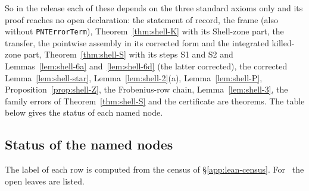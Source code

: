 So in the release each of these depends on the three standard axioms only and its proof reaches no open declaration: the statement of record,
the frame (also without \texttt{PNTErrorTerm}), Theorem~\ref{thm:shell-K} with its Shell-zone part, the transfer, the pointwise assembly in its corrected
form and the integrated killed-zone part, Theorem~\ref{thm:shell-S} with its steps S1 and S2 and Lemmas~\ref{lem:shell-6a} and~\ref{lem:shell-6d} (the
latter corrected), the corrected Lemma~\ref{lem:shell-star}, Lemma~\ref{lem:shell-2}(a), Lemma~\ref{lem:shell-P}, Proposition~\ref{prop:shell-Z}, the
Frobenius-row chain, Lemma~\ref{lem:shell-3}, the family errors of Theorem~\ref{thm:shell-S} and the certificate are theorems. The table below gives
the status of each named node.

\subsection{Status of the named nodes}
The label of each row is computed from the census of \S\ref{app:lean-census}.
For \tagLm\ the open leaves are listed.
